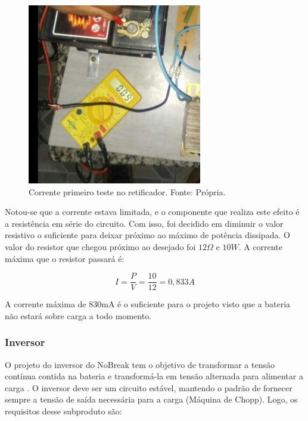                 \begin{figure}[!htb]
            		\centering
            		\includegraphics[scale= 0.6]{figuras/corrente_retificador.jpeg}
            		\caption{Corrente primeiro teste no retificador. Fonte: Própria.}
            		\label{corrente-retificador}
            	\end{figure}            	
            	
            	Notou-se que a corrente estava limitada, e o componente que realiza este 						efeito é a resistência em série do circuito. Com isso, foi decidido em 							diminuir o valor resistivo o suficiente para deixar próximo ao máximo de 						potência dissipada. O valor do resistor que chegou próximo ao desejado foi 						$12\Omega$ e $10W$. A corrente máxima que o resistor passará é:
            	
          	  	\begin{equation}
                	I = \frac{P}{V} = \frac{10}{12} = 0,833A
            	\end{equation}            	
            	
            	A corrente máxima de 830mA é o suficiente para o projeto visto que a bateria 					não estará sobre carga a todo momento.

            \subsubsection[Inversor]{Inversor}
				O projeto do inversor do NoBreak tem o objetivo de transformar a tensão 						contínua contida na bateria e transformá-la em tensão alternada para alimentar 				a carga . O inversor deve ser um circuito estável, mantendo o padrão de 						fornecer sempre a tensão de saída necessária para a carga (Máquina de Chopp). 					Logo, os requisitos desse subproduto são:
				

